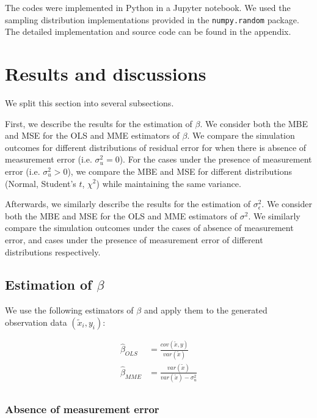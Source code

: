 \documentclass{article}
\begin{document}
The codes were implemented in Python in a Jupyter notebook. We used the sampling distribution implementations provided in the \verb|numpy.random| package. The detailed implementation and source code can be found in the appendix.

\section{Results and discussions}

We split this section into several subsections.

First, we describe the results for the estimation of $\beta$.
We consider both the MBE and MSE for the OLS and MME estimators of $\beta$. 
We compare the simulation outcomes for different distributions of residual error for when there is absence of measurement error (i.e. $\sigma^2_u = 0$).
For the cases under the presence of measurement error (i.e. $\sigma^2_u > 0$), we compare the MBE and MSE for different distributions (Normal, Student's $t$, $\chi^2$) while maintaining the same variance.

Afterwards, we similarly describe the results for the estimation of $\sigma^2_\epsilon$.
We consider both the MBE and MSE for the OLS and MME estimators of $\sigma^2$.
We similarly compare the simulation outcomes under the cases of absence of measurement error, and cases under the presence of measurement error of different distributions respectively.

\subsection{Estimation of $\beta$}

We use the following estimators of $\beta$ and apply them to the generated observation data $(\tilde{x}_i, y_i)$:

\begin{equation}
    \begin{split}
        \hat{\beta}_{OLS} &= \frac{cov(\tilde{x}, y)}{var(\tilde{x})}\\
        \hat{\beta}_{MME} &= \frac{var(\tilde{x})}{var(\tilde{x}) - \sigma^2_u}\\
    \end{split}
\end{equation}

\subsubsection{Absence of measurement error}
\end{document}
